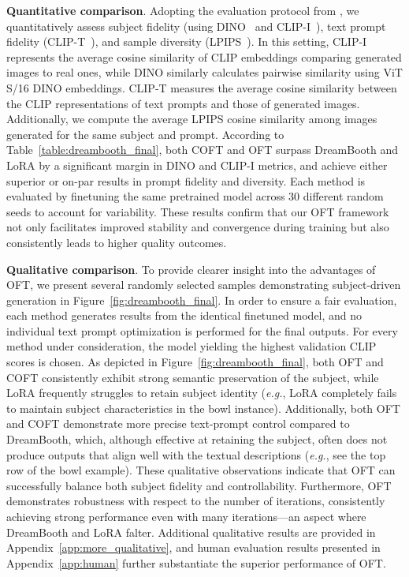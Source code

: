 \textbf{Quantitative comparison}. Adopting the evaluation protocol from \cite{ruiz2023dreambooth}, we quantitatively assess subject fidelity (using DINO~\cite{caron2021emerging} and CLIP-I~\cite{radford2021learning}), text prompt fidelity (CLIP-T~\cite{radford2021learning}), and sample diversity (LPIPS~\cite{zhang2018unreasonable}). In this setting, CLIP-I represents the average cosine similarity of CLIP embeddings comparing generated images to real ones, while DINO similarly calculates pairwise similarity using ViT S/16 DINO embeddings. CLIP-T measures the average cosine similarity between the CLIP representations of text prompts and those of generated images. Additionally, we compute the average LPIPS cosine similarity among images generated for the same subject and prompt. According to Table~\ref{table:dreambooth_final}, both COFT and OFT surpass DreamBooth and LoRA by a significant margin in DINO and CLIP-I metrics, and achieve either superior or on-par results in prompt fidelity and diversity. Each method is evaluated by finetuning the same pretrained model across 30 different random seeds to account for variability. These results confirm that our OFT framework not only facilitates improved stability and convergence during training but also consistently leads to higher quality outcomes.

\textbf{Qualitative comparison}. To provide clearer insight into the advantages of OFT, we present several randomly selected samples demonstrating subject-driven generation in Figure~\ref{fig:dreambooth_final}. In order to ensure a fair evaluation, each method generates results from the identical finetuned model, and no individual text prompt optimization is performed for the final outputs. For every method under consideration, the model yielding the highest validation CLIP scores is chosen. As depicted in Figure~\ref{fig:dreambooth_final}, both OFT and COFT consistently exhibit strong semantic preservation of the subject, while LoRA frequently struggles to retain subject identity (\emph{e.g.}, LoRA completely fails to maintain subject characteristics in the bowl instance). Additionally, both OFT and COFT demonstrate more precise text-prompt control compared to DreamBooth, which, although effective at retaining the subject, often does not produce outputs that align well with the textual descriptions (\emph{e.g.}, see the top row of the bowl example). These qualitative observations indicate that OFT can successfully balance both subject fidelity and controllability. Furthermore, OFT demonstrates robustness with respect to the number of iterations, consistently achieving strong performance even with many iterations—an aspect where DreamBooth and LoRA falter. Additional qualitative results are provided in Appendix~\ref{app:more_qualitative}, and human evaluation results presented in Appendix~\ref{app:human} further substantiate the superior performance of OFT.

